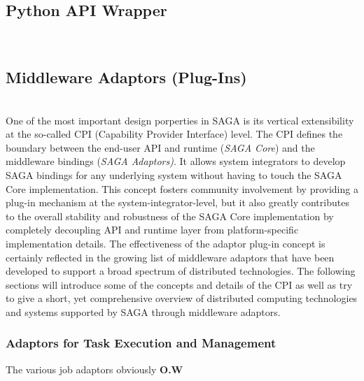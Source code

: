   \subsection{Python API Wrapper}
  \\
  

  \subsection{Middleware Adaptors (Plug-Ins)}
  \\
   One of the most important design porperties in SAGA is its vertical
   extensibility at the so-called CPI (Capability Provider Interface) level.
   The CPI defines the boundary between the end-user  API and runtime (\textit{SAGA Core}) and the middleware
   bindings (\textit{SAGA Adaptors)}.  It allows system integrators to develop
   SAGA bindings for any underlying system without having to touch the SAGA
   Core implementation.  This concept fosters community involvement by
   providing a plug-in mechanism at the  system-integrator-level, but it also greatly contributes to the
   overall stability and robustness of the SAGA Core implementation by
   completely decoupling API and runtime layer from platform-specific
   implementation details. The effectiveness of the adaptor plug-in concept is
   certainly reflected in the growing list of middleware adaptors that have
   been developed to support a broad spectrum of distributed technologies. The
   following sections will introduce some of the concepts and details of the
   CPI as well as try to give a short, yet comprehensive overview of
   distributed computing technologies and systems supported by SAGA through
   middleware adaptors.

 
  \subsubsection{Adaptors for Task Execution and Management} 
  The various job adaptors obviously \textbf{O.W}


